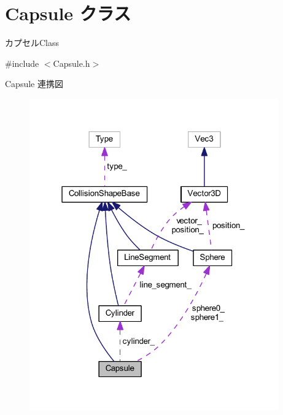 \hypertarget{class_capsule}{}\section{Capsule クラス}
\label{class_capsule}


カプセル\+Class  




{\ttfamily \#include $<$Capsule.\+h$>$}



Capsule 連携図\nopagebreak
\begin{figure}[H]
\begin{center}
\leavevmode
\includegraphics[width=304pt]{class_capsule__coll__graph}
\end{center}
\end{figure}

